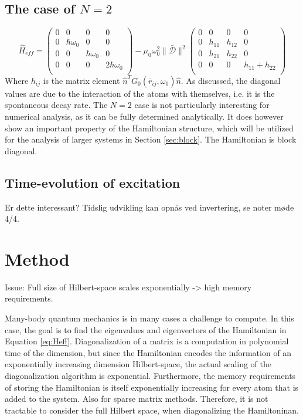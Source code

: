 \documentclass{article}
\begin{document}
\subsection{The case of $N=2$}\label{sec:N2}

\begin{equation}\label{eq:N2_general}
    \hat{H}_{eff} = 
    \begin{pmatrix}
        0 & 0 & 0 & 0 \\
        0 & \hbar \omega_0 & 0 & 0 \\
        0 & 0 & \hbar \omega_0 & 0 \\
        0 & 0 & 0 & 2 \hbar \omega_0 \\
    \end{pmatrix}
    - \mu_0 \omega_0^2 \| \bar{\mathscr{D}} \|^2
    \begin{pmatrix}
        0 & 0 & 0 & 0 \\
        0 & h_{11} & h_{12} & 0 \\
        0 & h_{21} & h_{22} & 0 \\
        0 & 0 & 0 & h_{11} + h_{22} \\
    \end{pmatrix}
\end{equation}
Where $h_{ij}$ is the matrix element $\hat{n}^T G_0(\bar{r}_{ij},\omega_0) \hat{n}$. As discussed, the diagonal values are due to the interaction of the atoms with themselves, i.e. it is the spontaneous decay rate. The $N=2$ case is not particularly interesting for numerical analysis, as it can be fully determined analytically. It does however show an important property of the Hamiltonian structure, which will be utilized for the analysis of larger systems in Section \ref{sec:block}. The Hamiltonian is block diagonal. 

\subsection{Time-evolution of excitation}

Er dette interessant? Tidslig udvikling kan opnås ved invertering, se noter møde 4/4.

\section{Method}

Issue: Full size of Hilbert-space scales exponentially -> high memory requirements.

Many-body quantum mechanics is in many cases a challenge to compute. In this case, the goal is to find the eigenvalues and eigenvectors of the Hamiltonian in Equation \ref{eq:Heff}. Diagonalization of a matrix is a computation in polynomial time of the dimension, but since the Hamiltonian encodes the information of an exponentially increasing dimension Hilbert-space, the actual scaling of the diagonalization algorithm is exponential. Furthermore, the memory requirements of storing the Hamiltonian is itself exponentially increasing for every atom that is added to the system. Also for sparse matrix methods. Therefore, it is not tractable to consider the full Hilbert space, when diagonalizing the Hamiltoninan. 
\end{document}
